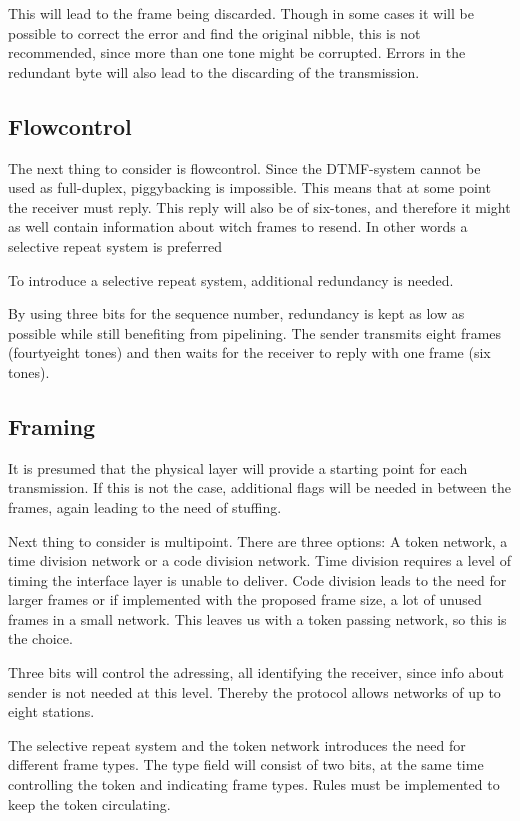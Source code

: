 \documentclass[letterpaper]{article}
\begin{document}
This will lead to the frame being discarded. Though in some cases it will be
possible to correct the error and find the original nibble, this is not
recommended, since more than one tone might be corrupted. Errors in the
redundant byte will also lead to the discarding of the transmission.


\subsection{Flowcontrol}
The next thing to consider is flowcontrol. Since the DTMF-system
cannot be used as full-duplex, piggybacking is impossible. This means that at
some point the receiver must reply. This reply will also be of six-tones, and
therefore it might as well contain information about witch frames to resend. In
other words a selective repeat system is preferred

To introduce a selective repeat system, additional redundancy is needed.

By using three bits for the sequence number, redundancy is kept as low as
possible while still benefiting from pipelining. The sender transmits eight
frames (fourtyeight tones) and then waits for the receiver to reply with one
frame (six tones).

\subsection{Framing}
It is presumed that the physical layer will provide a starting point for each
transmission. If this is not the case,
additional flags will be needed in between the frames, again leading to the need
of stuffing.

Next thing to consider is multipoint. There are three options: A token
network, a time division network or a code division network. Time division
requires a level of timing the interface layer is unable to deliver.
Code division leads to the need for larger frames or if implemented with the
proposed frame size, a lot of unused frames in a small network. This leaves us
with a token passing network, so this is the choice.

Three bits will control the adressing, all identifying the receiver, since info
about sender is not needed at this level. Thereby the protocol allows networks
of up to eight stations.

The selective repeat system and the token network introduces the need for different frame types.
The type field will consist of two bits, at the same time controlling
the token and indicating frame types. Rules must be implemented to keep the token circulating.
\end{document}
